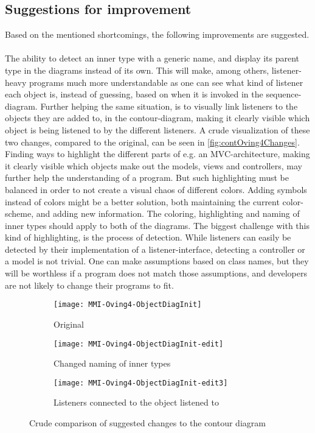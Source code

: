 \subsection{Suggestions for improvement}\label{jiveSuggestions}

Based on the mentioned shortcomings, the following improvements are suggested.
~\\

The ability to detect an inner type with a generic name, and display its parent type in the diagrams instead of its own.
This will make, among others, listener-heavy programs much more understandable as one can see what kind of listener each object is, instead of guessing, based on when it is invoked in the sequence-diagram.
Further helping the same situation, is to visually link listeners to the objects they are added to, in the contour-diagram, making it clearly visible which object is being listened to by the different listeners.
A crude visualization of these two changes, compared to the original, can be seen in \autoref{fig:contOving4Changes}.
~\\

Finding ways to highlight the different parts of e.g. an MVC-architecture, making it clearly visible which objects make out the models, views and controllers, may further help the understanding of a program.
But such highlighting must be balanced in order to not create a visual chaos of different colors.
Adding symbols instead of colors might be a better solution, both maintaining the current color-scheme, and adding new information.
The coloring, highlighting and naming of inner types should apply to both of the diagrams.
The biggest challenge with this kind of highlighting, is the process of detection.
While listeners can easily be detected by their implementation of a listener-interface, detecting a controller or a model is not trivial.
One can make assumptions based on class names, but they will be worthless if a program does not match those assumptions, and developers are not likely to change their programs to fit.
~\\

\begin{figure}[H]
	\centering
	\begin{subfigure}{\textwidth}
		\centering
		\texttt{[image: MMI-Oving4-ObjectDiagInit]}
		\caption{Original}
		\label{fig:contOving4ChangesA}
	\end{subfigure}
	\begin{subfigure}{\textwidth}
		\centering
		\texttt{[image: MMI-Oving4-ObjectDiagInit-edit]}
		\caption{Changed naming of inner types}
		\label{fig:contOving4ChangesB}
	\end{subfigure}
	\begin{subfigure}{\textwidth}
		\centering
		\texttt{[image: MMI-Oving4-ObjectDiagInit-edit3]}
		\caption{Listeners connected to the object listened to}
		\label{fig:contOving4ChangesC}
	\end{subfigure}
	\caption{Crude comparison of suggested changes to the contour diagram}
	\label{fig:contOving4Changes} 
\end{figure}

